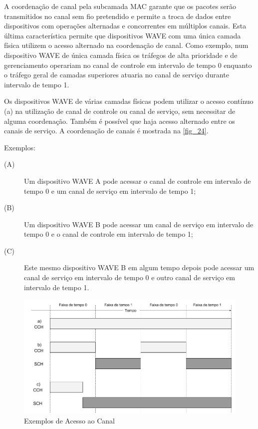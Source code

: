 \documentclass[
12pt,				%
openright,			%
oneside,			%
a4paper,			%
brazil,				%
]{abntex2}
\begin{document}
	\par A coordenação de canal pela subcamada MAC garante que os pacotes serão transmitidos no canal sem fio pretendido e permite a troca de dados entre dispositivos com operações alternadas e concorrentes em múltiplos canais. Esta última característica permite que dispositivos WAVE com uma única camada física utilizem o acesso alternado na coordenação de canal. Como exemplo, num dispositivo WAVE de única camada física os tráfegos de alta prioridade e de gerenciamento operariam no canal de controle em intervalo de tempo 0 enquanto o tráfego geral de camadas superiores atuaria no canal de serviço durante intervalo de tempo 1. 
	
	\par Os dispositivos WAVE de várias camadas físicas podem utilizar o acesso contínuo (a) na utilização de canal de controle ou canal de serviço, sem necessitar de alguma coordenação. Também é possível que haja acesso alternado entre os canais de serviço. A coordenação de canais é mostrada na \autoref{fig_24}.
	
	\begin{description}
        \item Exemplos:
    \end{description}
    
	\begin{description}
		\item[(A)] Um dispositivo WAVE A pode acessar o canal de controle em intervalo de tempo 0 e um canal de serviço em intervalo de tempo 1;
		\item[(B)] Um dispositivo WAVE B pode acessar um canal de serviço em intervalo de tempo 0 e o canal de controle em intervalo de tempo 1;
		\item[(C)] Este mesmo dispositivo WAVE B em algum tempo depois pode acessar um canal de serviço em intervalo de tempo 0 e outro canal de serviço em intervalo de tempo 1.	
	\end{description}
	
	\begin{figure} [H]
		\centering
		\includegraphics[scale=.5]{figuras/cap3/24ExemplosDeAcessoAoCanal}
		\caption{\label{fig_24}Exemplos de Acesso ao Canal}
	\end{figure}
	
\end{document}
